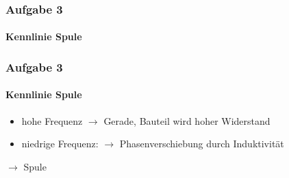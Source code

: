 \begin{frame}
\frametitle{Aufgabe 3}
\framesubtitle{Kennlinie Spule}
    \begin{figure}[H]
    \begin{center}
    \end{center}
    \end{figure}
\end{frame}
\begin{frame}
\frametitle{Aufgabe 3}
\framesubtitle{Kennlinie Spule}
\begin{itemize}
    \item hohe Frequenz $\rightarrow$ Gerade, Bauteil wird hoher Widerstand
    \item niedrige Frequenz: $\rightarrow$ Phasenverschiebung durch
    Induktivität
\end{itemize}
$\rightarrow$ Spule
\end{frame}
